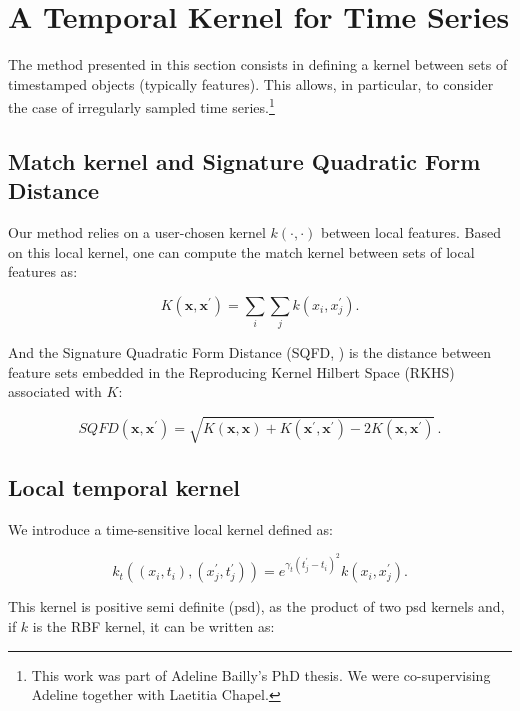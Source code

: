 \section{A Temporal Kernel for Time Series}
\label{sec:kernel}

The method presented in this section consists in defining a kernel between
sets of timestamped objects (typically features).
This allows, in particular, to consider the case of irregularly sampled time
series.\footnote{This work was part of Adeline Bailly's PhD thesis.
We were co-supervising Adeline together with Laetitia Chapel.}

\subsection{Match kernel and Signature Quadratic Form Distance}

Our method relies on a user-chosen kernel $k(\cdot,\cdot)$ between local
features.
Based on this local kernel, one can compute the match kernel
\cite{NIPS2009_3874} between sets of local features as:

\begin{equation}
    K(\mathbf{x}, \mathbf{x}^\prime) = \sum_i \sum_j k(x_i, x^\prime_j).
\end{equation}

And the Signature Quadratic Form Distance (SQFD,
\cite{10.1145/1631272.1631391}) is the distance
between feature sets embedded in the Reproducing Kernel Hilbert Space (RKHS)
associated with $K$:

\begin{equation}
    SQFD(\mathbf{x}, \mathbf{x}^\prime) =
        \sqrt{K(\mathbf{x}, \mathbf{x})
              + K(\mathbf{x}^\prime, \mathbf{x}^\prime)
              - 2 K(\mathbf{x}, \mathbf{x}^\prime)}
        \, .
\end{equation}

\subsection{Local temporal kernel}

We introduce a time-sensitive local kernel defined as:

\begin{equation}
    k_t((x_i, t_i), (x^\prime_j, t^\prime_j)) = e^{\gamma_t (t^\prime_j - t_i)^2} k(x_i, x^\prime_j).
\end{equation}

This kernel is positive semi definite (psd), as the product of two psd kernels
and, if $k$ is the RBF kernel, it can be written as:

